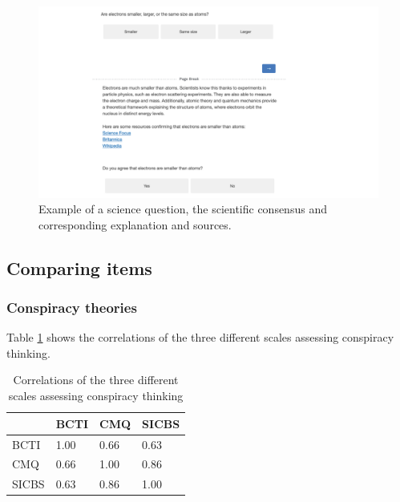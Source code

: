 \documentclass[
  doc,floatsintext]{apa6}
\begin{document}
\begin{figure}

\includegraphics[width=1\linewidth]{./figures/study2_question_example} \hfill{}

\caption{Example of a science question, the scientific consensus and corresponding explanation and sources.}\label{fig:exp2-stimulus-example}
\end{figure}

\subsection{Comparing items}\label{comparing-items-1}

\subsubsection{Conspiracy theories}\label{conspiracy-theories-1}

Table \ref{tab:exp2-correlation-conspiracy} shows the correlations of the three different scales assessing conspiracy thinking.

\begin{table}[h]

\begin{center}
\begin{threeparttable}

\caption{\label{tab:exp2-correlation-conspiracy}Correlations of the three different scales assessing conspiracy thinking}

\begin{tabular}{llll}
\toprule
 & \multicolumn{1}{c}{BCTI} & \multicolumn{1}{c}{CMQ} & \multicolumn{1}{c}{SICBS}\\
\midrule
BCTI & 1.00 & 0.66 & 0.63\\
CMQ & 0.66 & 1.00 & 0.86\\
SICBS & 0.63 & 0.86 & 1.00\\
\bottomrule
\end{tabular}

\end{threeparttable}
\end{center}

\end{table}
\end{document}
